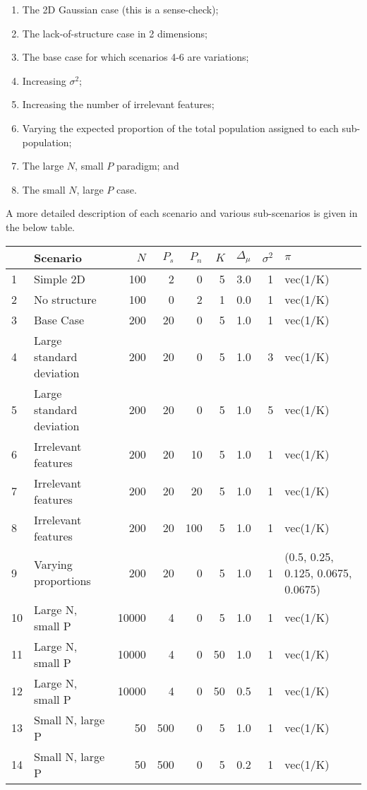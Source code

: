 \documentclass[
]{book}
\providecommand{\tightlist}{%
  \setlength{\itemsep}{0pt}\setlength{\parskip}{0pt}}
\begin{document}
\begin{enumerate}
\def\labelenumi{\arabic{enumi}.}
\tightlist
\item
  The 2D Gaussian case (this is a sense-check);
\item
  The lack-of-structure case in 2 dimensions;
\item
  The base case for which scenarios 4-6 are variations;
\item
  Increasing \(\sigma^2\);
\item
  Increasing the number of irrelevant features;
\item
  Varying the expected proportion of the total population assigned to each sub-population;
\item
  The large \(N\), small \(P\) paradigm; and
\item
  The small \(N\), large \(P\) case.
\end{enumerate}

A more detailed description of each scenario and various sub-scenarios is given in the below table.

\begin{tabular}{l|l|r|r|r|r|r|r|l}
\hline
  & Scenario & $N$ & $P_s$ & $P_n$ & $K$ & $\Delta_{\mu}$ & $\sigma^2$ & $\pi$\\
\hline
1 & Simple 2D & 100 & 2 & 0 & 5 & 3.0 & 1 & vec(1/K)\\
\hline
2 & No structure & 100 & 0 & 2 & 1 & 0.0 & 1 & vec(1/K)\\
\hline
3 & Base Case & 200 & 20 & 0 & 5 & 1.0 & 1 & vec(1/K)\\
\hline
4 & Large standard deviation & 200 & 20 & 0 & 5 & 1.0 & 3 & vec(1/K)\\
\hline
5 & Large standard deviation & 200 & 20 & 0 & 5 & 1.0 & 5 & vec(1/K)\\
\hline
6 & Irrelevant features & 200 & 20 & 10 & 5 & 1.0 & 1 & vec(1/K)\\
\hline
7 & Irrelevant features & 200 & 20 & 20 & 5 & 1.0 & 1 & vec(1/K)\\
\hline
8 & Irrelevant features & 200 & 20 & 100 & 5 & 1.0 & 1 & vec(1/K)\\
\hline
9 & Varying proportions & 200 & 20 & 0 & 5 & 1.0 & 1 & (0.5, 0.25, 0.125, 0.0675, 0.0675)\\
\hline
10 & Large N, small P & 10000 & 4 & 0 & 5 & 1.0 & 1 & vec(1/K)\\
\hline
11 & Large N, small P & 10000 & 4 & 0 & 50 & 1.0 & 1 & vec(1/K)\\
\hline
12 & Large N, small P & 10000 & 4 & 0 & 50 & 0.5 & 1 & vec(1/K)\\
\hline
13 & Small N, large P & 50 & 500 & 0 & 5 & 1.0 & 1 & vec(1/K)\\
\hline
14 & Small N, large P & 50 & 500 & 0 & 5 & 0.2 & 1 & vec(1/K)\\
\hline
\end{tabular}
\end{document}
